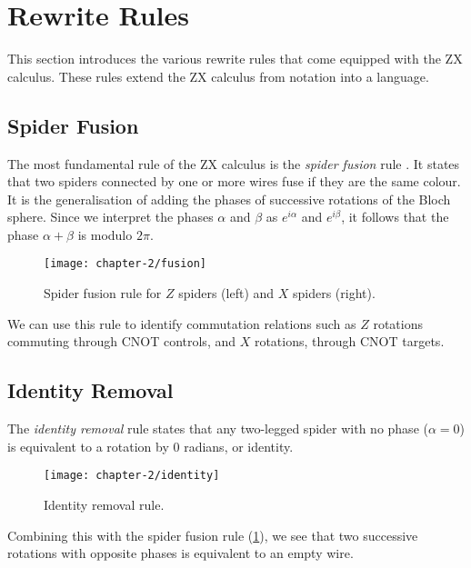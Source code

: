 \section{Rewrite Rules}

This section introduces the various rewrite rules that come equipped with the ZX calculus. These rules extend the ZX calculus from notation into a language.

\subsection{Spider Fusion}%
The most fundamental rule of the ZX calculus is the \textit{spider fusion} rule \cite{Wetering2020}. It states that two spiders connected by one or more wires fuse if they are the same colour. It is the generalisation of adding the phases of successive rotations of the Bloch sphere. Since we interpret the phases $\alpha$ and $\beta$ as $e^{i\alpha}$ and $e^{i\beta}$, it follows that the phase $\alpha + \beta$ is modulo $2\pi$.

\begin{figure}[H]
    \centering
    \texttt{[image: chapter-2/fusion]}
    \caption{Spider fusion rule for $Z$ spiders (left) and $X$ spiders (right).}
    \label{spider-fusion}
\end{figure}

We can use this rule to identify commutation relations such as $Z$ rotations commuting through CNOT controls, and $X$ rotations, through CNOT targets.



\subsection{Identity Removal}%

The \textit{identity removal} rule states that any two-legged spider with no phase ($\alpha = 0$) is equivalent to a rotation by 0 radians, or identity.

\begin{figure}[H]
    \centering
    \texttt{[image: chapter-2/identity]}
    \caption{Identity removal rule.}
    \label{identity}
\end{figure}

Combining this with the spider fusion rule (\ref{spider-fusion}), we see that two successive rotations with opposite phases is equivalent to an empty wire.

